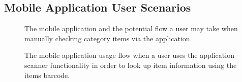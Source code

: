 \documentclass[a4paper,11pt]{report}
\begin{document}
\begin{appendix}
    \chapter{Mobile Application User Scenarios}
    \label{appendix:mobileUI}
    
    \begin{figure}
        \caption{The mobile application and the potential flow a user may take when manually checking category items via the application.}
        \label{fig:mobileUIpt2}
    \end{figure}

    \begin{figure}
        \caption{The mobile application usage flow when a user uses the application scanner functionality in order to look up item information using the items barcode.}
        \label{fig:mobileUIpt2}
    \end{figure}


\end{appendix}
\end{document}
